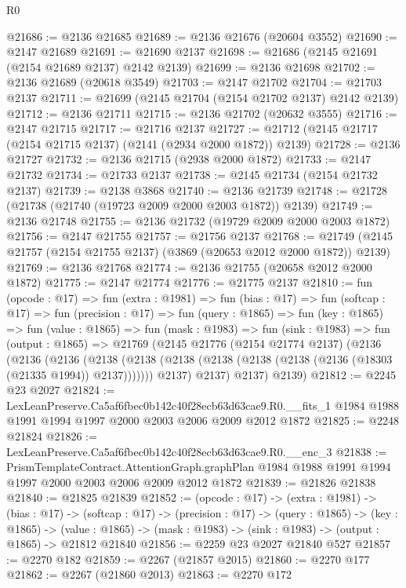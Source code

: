 \begin{lexlean}{R0}
\begin{coremodule}
@21686 := @2136 @21685
@21689 := @2136 @21676 (@20604 @3552)
@21690 := @2147 @21689
@21691 := @21690 @2137
@21698 := @21686 (@2145 @21691 (@2154 @21689 @2137) @2142 @2139)
@21699 := @2136 @21698
@21702 := @2136 @21689 (@20618 @3549)
@21703 := @2147 @21702
@21704 := @21703 @2137
@21711 := @21699 (@2145 @21704 (@2154 @21702 @2137) @2142 @2139)
@21712 := @2136 @21711
@21715 := @2136 @21702 (@20632 @3555)
@21716 := @2147 @21715
@21717 := @21716 @2137
@21727 := @21712 (@2145 @21717 (@2154 @21715 @2137) (@2141 (@2934 @2000 @1872)) @2139)
@21728 := @2136 @21727
@21732 := @2136 @21715 (@2938 @2000 @1872)
@21733 := @2147 @21732
@21734 := @21733 @2137
@21738 := @2145 @21734 (@2154 @21732 @2137)
@21739 := @2138 @3868
@21740 := @2136 @21739
@21748 := @21728 (@21738 (@21740 (@19723 @2009 @2000 @2003 @1872)) @2139)
@21749 := @2136 @21748
@21755 := @2136 @21732 (@19729 @2009 @2000 @2003 @1872)
@21756 := @2147 @21755
@21757 := @21756 @2137
@21768 := @21749 (@2145 @21757 (@2154 @21755 @2137) (@3869 (@20653 @2012 @2000 @1872)) @2139)
@21769 := @2136 @21768
@21774 := @2136 @21755 (@20658 @2012 @2000 @1872)
@21775 := @2147 @21774
@21776 := @21775 @2137
@21810 := fun (opcode : @17) =>
  fun (extra : @1981) =>
  fun (bias : @17) =>
  fun (softcap : @17) =>
  fun (precision : @17) =>
  fun (query : @1865) =>
  fun (key : @1865) =>
  fun (value : @1865) =>
  fun (mask : @1983) =>
  fun (sink : @1983) =>
  fun (output : @1865) =>
  @21769
    (@2145
      @21776
      (@2154 @21774 @2137)
      (@2136
        (@2136
          (@2136
            (@2138 (@2138 (@2138 (@2138 (@2138 (@2138 (@2136 (@18303 (@21335 @1994)) @2137)))))))
            @2137)
          @2137)
        @2137)
      @2139)
@21812 := @2245 @23 @2027
@21824 := LexLeanPreserve.Ca5af6fbec0b142c40f28ecb63d63cae9.R0.__fits_1
    @1984
    @1988
    @1991
    @1994
    @1997
    @2000
    @2003
    @2006
    @2009
    @2012
    @1872
@21825 := @2248 @21824
@21826 := LexLeanPreserve.Ca5af6fbec0b142c40f28ecb63d63cae9.R0.__enc_3
@21838 := PrismTemplateContract.AttentionGraph.graphPlan
    @1984
    @1988
    @1991
    @1994
    @1997
    @2000
    @2003
    @2006
    @2009
    @2012
    @1872
@21839 := @21826 @21838
@21840 := @21825 @21839
@21852 := (opcode : @17) ->
  (extra : @1981) ->
  (bias : @17) ->
  (softcap : @17) ->
  (precision : @17) ->
  (query : @1865) ->
  (key : @1865) ->
  (value : @1865) -> (mask : @1983) -> (sink : @1983) -> (output : @1865) -> @21812 @21840
@21856 := @2259 @23 @2027 @21840 @527
@21857 := @2270 @182
@21859 := @2267 (@21857 @2015)
@21860 := @2270 @177
@21862 := @2267 (@21860 @2013)
@21863 := @2270 @172

\end{coremodule}
\end{lexlean}
